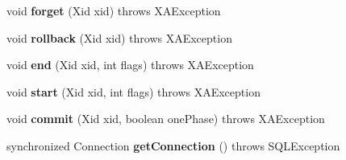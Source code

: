 \begin{DoxyCompactItemize}
void {\bfseries forget} (Xid xid)  throws X\+A\+Exception 
\item 
\mbox{\label{classcom_1_1mysql_1_1cj_1_1jdbc_1_1_mysql_x_a_connection_a0b19cab042f62f44adf248e080ea39b7}} 
void {\bfseries rollback} (Xid xid)  throws X\+A\+Exception 
\item 
\mbox{\label{classcom_1_1mysql_1_1cj_1_1jdbc_1_1_mysql_x_a_connection_a6f20466a27da1aa3a0e5dabb3255d49b}} 
void {\bfseries end} (Xid xid, int flags)  throws X\+A\+Exception 
\item 
\mbox{\label{classcom_1_1mysql_1_1cj_1_1jdbc_1_1_mysql_x_a_connection_abcfd20e77b38e5a5a28fba5c841c2279}} 
void {\bfseries start} (Xid xid, int flags)  throws X\+A\+Exception 
\item 
\mbox{\label{classcom_1_1mysql_1_1cj_1_1jdbc_1_1_mysql_x_a_connection_a8ce071c6596c3f33c815fbe697fd619c}} 
void {\bfseries commit} (Xid xid, boolean one\+Phase)  throws X\+A\+Exception 
\item 
\mbox{\label{classcom_1_1mysql_1_1cj_1_1jdbc_1_1_mysql_x_a_connection_a0907b211fc78dda2fe38e381a74b4d7c}} 
synchronized Connection {\bfseries get\+Connection} ()  throws S\+Q\+L\+Exception 
\end{DoxyCompactItemize}
